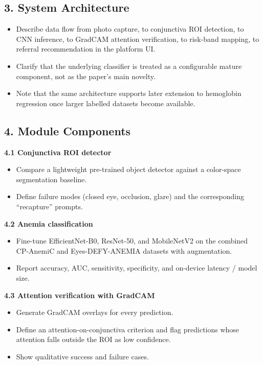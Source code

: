 \documentclass[11pt]{article}
\begin{document}
    \subsection{3. System Architecture}

    \begin{itemize}[leftmargin=1.5em]
        \item Describe data flow from photo capture, to conjunctiva ROI detection, to CNN inference, to GradCAM attention verification, to risk-band mapping, to referral recommendation in the platform UI.
        \item Clarify that the underlying classifier is treated as a configurable mature component, not as the paper's main novelty.
        \item Note that the same architecture supports later extension to hemoglobin regression once larger labelled datasets become available.
    \end{itemize}

    \subsection{4. Module Components}

    \textbf{4.1 Conjunctiva ROI detector}
    \begin{itemize}[leftmargin=1.5em]
        \item Compare a lightweight pre-trained object detector against a color-space segmentation baseline.
        \item Define failure modes (closed eye, occlusion, glare) and the corresponding ``recapture'' prompts.
    \end{itemize}

    \textbf{4.2 Anemia classification}
    \begin{itemize}[leftmargin=1.5em]
        \item Fine-tune EfficientNet-B0, ResNet-50, and MobileNetV2 on the combined CP-AnemiC and Eyes-DEFY-ANEMIA datasets with augmentation.
        \item Report accuracy, AUC, sensitivity, specificity, and on-device latency / model size.
    \end{itemize}

    \textbf{4.3 Attention verification with GradCAM}
    \begin{itemize}[leftmargin=1.5em]
        \item Generate GradCAM overlays for every prediction.
        \item Define an attention-on-conjunctiva criterion and flag predictions whose attention falls outside the ROI as low confidence.
        \item Show qualitative success and failure cases.
    \end{itemize}
\end{document}
